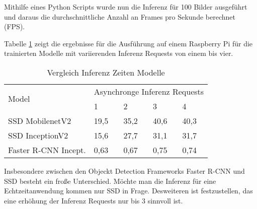 Mithilfe eines Python Scripts wurde nun die Inferenz für 100 Bilder 
ausgeführt und daraus die durchschnittliche Anzahl an Frames pro 
Sekunde berechnet (FPS).

Tabelle \ref{table:infertime} zeigt die ergebnisse für die 
Ausführung auf einem Raspberry Pi für die trainierten Modelle mit 
variierenden Inferenz Requests von einem bis vier.

\vspace{1cm}

\begin{table}[htb]
  \centering
  \label{table:infertime}
  \begin{tabular}{m{}|m{}<{\centering}|m{}<{\centering}|m{}<{\centering}|m{}<{\centering}}
  \hline
  \multirow{2}{*}{Model} & \multicolumn{4}{c}{Asynchronge Inferenz Requests} \\ \cline{2-5} 
                         & 1           & 2          & 3          & 4          \\ \hline\hline
  SSD MobilenetV2        & 19,5           & 35,2          & 40,6          & 40,3          \\
  SSD InceptionV2        & 15,6           & 27,7          & 31,1          & 31,7          \\
  Faster R-CNN Incept.   & 0,63           & 0,67          & 0,75          & 0,74          \\ \hline
  \end{tabular}
  \caption{Vergleich Inferenz Zeiten Modelle}
\end{table}

\vspace{1cm}

Insbesondere zwischen den Objeckt Detection Frameworks Faster R-CNN 
und SSD besteht ein froße Unterschied.
Möchte man die Inferenz für eine Echtzeitanwendung kommen nur SSD in Frage.
Desweiteren ist festzustellen, das eine erhöhung der Inferenz Requests 
nur bis 3 sinnvoll ist.


